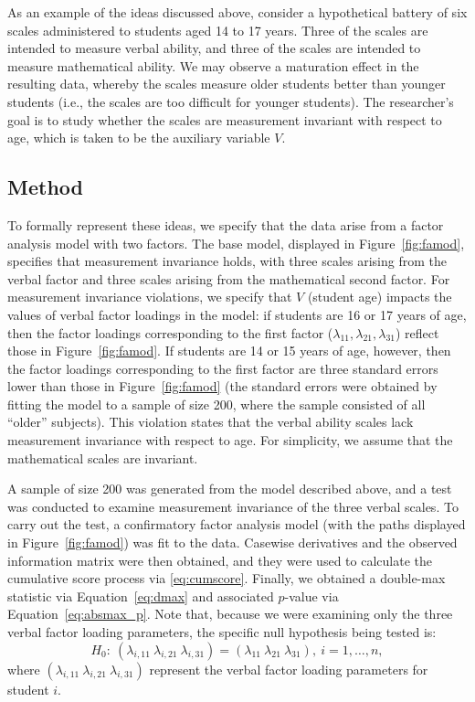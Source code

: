 \documentclass[man]{apa}
\begin{document}
As an example of the ideas discussed above, consider a
hypothetical battery of six scales administered to students aged 14 to 17
years.  Three of the scales are intended to measure verbal ability, and
three of the scales are intended to measure mathematical ability.  We
may observe a maturation effect in the resulting data, whereby the scales
measure older students better than younger students (i.e., the scales
are too difficult for younger students).  The researcher's goal is to
study whether the scales are measurement invariant with
respect to age, which is taken to be the auxiliary variable $V$.

\subsection{Method}

To formally represent these ideas, we specify that the data arise from
a factor analysis model with two factors.  The base model, displayed in
Figure~\ref{fig:famod}, specifies that measurement invariance holds,
with three scales arising from the verbal factor and three 
scales arising from the mathematical second factor.
For measurement invariance violations, we specify that $V$
(student age) impacts the values of 
verbal factor loadings in the model: 
if students are 16 or 17 years of age, then the factor
loadings corresponding to the first 
factor ($\lambda_{11}, \lambda_{21}, \lambda_{31}$) reflect those in
Figure~\ref{fig:famod}.  If students are 14 or 15 years of age,
however, then the factor loadings corresponding to the first factor
are three standard errors lower than those in Figure~\ref{fig:famod}
(the standard errors were obtained by fitting
  the model to a sample of size 200, where the sample consisted of all
  ``older'' subjects).
This violation states that the verbal ability scales
lack measurement invariance with respect to age.  For simplicity, we
assume that the mathematical scales are invariant.



A sample of size 200 was generated from the model described above, and
a test was conducted to examine measurement invariance of the three
verbal scales.  To carry out
the test, a confirmatory factor analysis model (with the paths
displayed in Figure~\ref{fig:famod}) was fit to the
data.  Casewise derivatives and 
the observed information matrix were then obtained, and they were used
to calculate the cumulative score process via
\eqref{eq:cumscore}.  Finally, we
obtained a 
double-max statistic via Equation~\eqref{eq:dmax} and associated
$p$-value via Equation~\eqref{eq:absmax_p}.  Note that, because we
were examining only the three verbal factor loading parameters, the
specific null hypothesis being tested is:
\begin{equation}
    \label{eq:exh0}
H_0:\ (\lambda_{i,11}\ \lambda_{i,21}\ \lambda_{i,31}) =
(\lambda_{11}\ \lambda_{21}\ \lambda_{31}),\ i=1,\ldots,n,
\end{equation}
where $(\lambda_{i,11}\ \lambda_{i,21}\ \lambda_{i,31})$ represent the
verbal factor loading parameters for student $i$.
\end{document}
